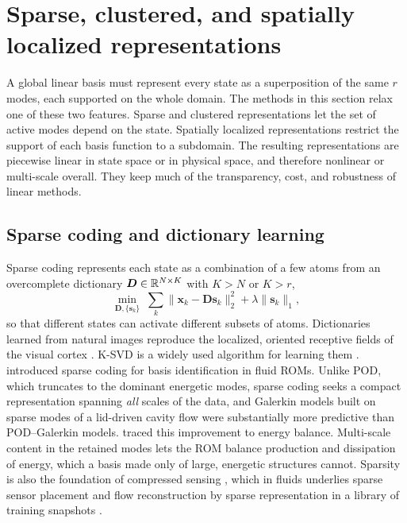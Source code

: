 \section{Sparse, clustered, and spatially localized representations}
\label{sec:local}

A global linear basis must represent every state as a superposition of the
same $r$ modes, each supported on the whole domain. The methods in this section
relax one of these two features. Sparse and clustered representations let the
set of active modes depend on the state. Spatially localized representations
restrict the support of each basis function to a subdomain. The resulting
representations are piecewise linear in state space or in physical space, and
therefore nonlinear or multi-scale overall. They keep much of the transparency,
cost, and robustness of linear methods.

\subsection{Sparse coding and dictionary learning}

Sparse coding represents each state as a combination of a few atoms from an
overcomplete dictionary $\bm{D}\in\mathbb{R}^{N\times K}$ with $K>N$ or $K>r$,
\begin{equation}
  \min_{\bm{D},\{\bm{s}_k\}}\;\sum_{k}\|\bm{x}_k-\bm{D}\bm{s}_k\|_2^2+\lambda\|\bm{s}_k\|_1,
\end{equation}
so that different states can activate different subsets of atoms.
Dictionaries learned from natural images reproduce the localized, oriented
receptive fields of the visual cortex \parencite{olshausen1996}. K-SVD is a
widely used algorithm for learning them \parencite{aharon2006ksvd}.
\textcite{deshmukh2016sparse} introduced sparse coding for basis identification
in fluid ROMs. Unlike POD, which truncates to the dominant energetic modes,
sparse coding seeks a compact representation spanning \emph{all} scales of the
data, and Galerkin models built on sparse modes of a lid-driven cavity flow were
substantially more predictive than POD--Galerkin models.
\textcite{deshmukh2018energy} traced this improvement to energy balance.
Multi-scale content in the retained modes lets the ROM balance production and
dissipation of energy, which a basis made only of large, energetic structures
cannot. Sparsity is also the foundation of compressed sensing
\parencite{candes2006robust,donoho2006cs}, which in fluids underlies sparse
sensor placement \parencite{manohar2018sensor} and flow reconstruction by
sparse representation in a library of training snapshots
\parencite{callaham2019robust}.

